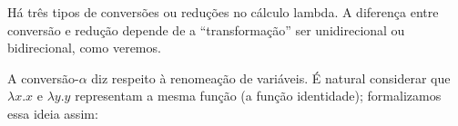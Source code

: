 \documentclass[../../../include/open-logic-section]{subfiles}
\begin{document}

Há três tipos de conversões ou reduções no cálculo lambda. A
diferença entre conversão e redução depende de a
``transformação'' ser unidirecional ou bidirecional, como veremos.

A conversão-$\alpha$ diz respeito à renomeação de variáveis. É natural
considerar que $\lambda x. x$ e $\lambda y.y$ representam a mesma
função (a função identidade); formalizamos essa ideia assim:
\end{document}
